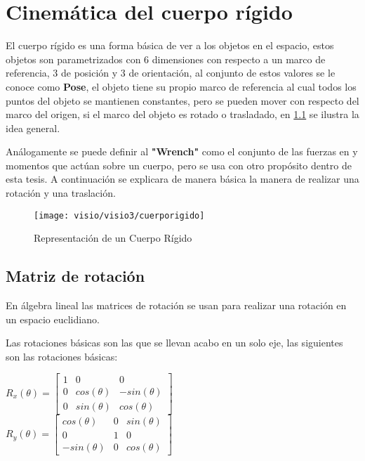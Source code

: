 \chapter{Cinemática del cuerpo rígido} \label{cinematica}
El cuerpo rígido es una forma básica de ver a los objetos en el espacio, estos objetos son parametrizados con 6 dimensiones con respecto a un marco de referencia, 3 de posición y 3 de orientación, al conjunto de estos valores se le conoce como \textbf{Pose}, el objeto tiene su propio marco de referencia al cual todos los puntos del objeto se mantienen constantes, pero se pueden mover con respecto del marco del origen, si el marco del objeto es rotado o trasladado, en \cref{fig:cuerporigido} se ilustra la idea general.

Análogamente se puede definir al \textbf{"Wrench"} como el conjunto de las fuerzas en y momentos que actúan sobre un cuerpo, pero se usa con otro propósito dentro de esta tesis.
A continuación se explicara de manera básica la manera de realizar una rotación y una traslación.

\begin{figure}[h]
	\centering
	\texttt{[image: visio/visio3/cuerporigido]}
	\caption{Representación de un Cuerpo Rígido}
	\label{fig:cuerporigido}
\end{figure}

\section{Matriz de rotación}

En álgebra lineal las matrices de rotación se usan para realizar una rotación en un espacio euclidiano.

Las rotaciones básicas son las que se llevan acabo en un solo eje, las siguientes son las rotaciones básicas:

$R_x(\theta)=\begin{bmatrix}
1	& 0 &0  \\ 
0	&  cos(\theta)& -sin(\theta) \\ 
0	& sin(\theta) & cos(\theta) 
\end{bmatrix}$\\

$R_y(\theta)=\begin{bmatrix}
	cos(\theta)	& 0 & sin(\theta)  \\ 
	0	&  1 & 0 \\ 
	-sin(\theta)	& 0 & cos(\theta) 
\end{bmatrix}$\\

